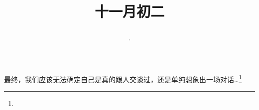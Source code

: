 \title{\date[d=2,m=12,y=2024][year:cn-y,年,month:cn,day:cn,日,·,weekday]·十一月初二 }
最终，我们应该无法确定自己是真的跟人交谈过，还是单纯想象出一场对话…\footnote{ }

